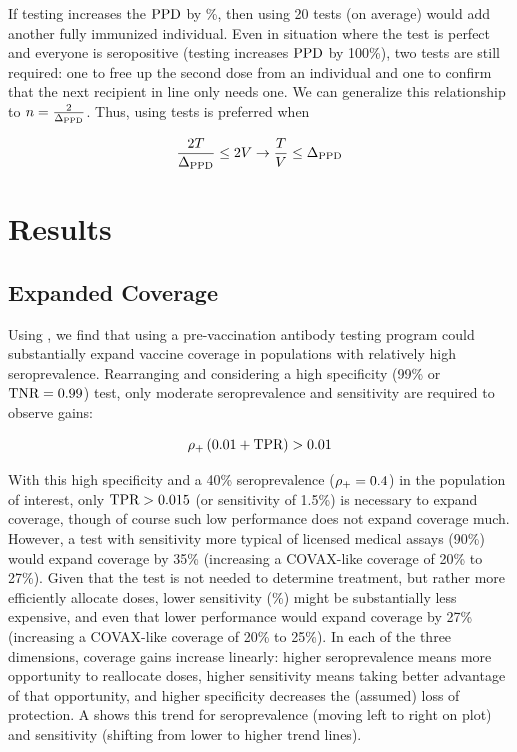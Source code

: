 \documentclass[10pt,a4paper,twocolumn]{article}
\begin{document}
If testing increases the $\textrm{PPD}$ by \%, then using 20 tests (on average) would add another fully immunized individual. Even in situation where the test is perfect and everyone is seropositive (\ie* testing increases $\textrm{PPD}$ by 100\%), two tests are still required: one to free up the second dose from an individual and one to confirm that the next recipient in line only needs one. We can generalize this relationship to $n = \frac{2}{\Delta_{\textrm{PPD}}}$. Thus, using tests is preferred when

\begin{equation}\label{costlim}
\frac{2T}{\Delta_{\textrm{PPD}}} \le 2V \rightarrow \frac{T}{V} \le \Delta_{\textrm{PPD}}
\end{equation}

\section*{Results}

\subsection*{Expanded Coverage}

Using , we find that using a pre-vaccination antibody testing program could substantially expand vaccine coverage in populations with relatively high seroprevalence. Rearranging  and considering a high specificity (99\% or $\textrm{TNR}=0.99$) test, only moderate seroprevalence and sensitivity are required to observe gains: 

\begin{equation}\label{egppd}
\rho_{{+}} \left(0.01 + \textrm{TPR}\right) > 0.01
\end{equation}

With this high specificity and a 40\% seroprevalence \mbox{($\rho_{{+}}=0.4$)} in the population of interest, only $\textrm{TPR} > 0.015$ (or sensitivity of 1.5\%) is necessary to expand coverage, though of course such low performance does not expand coverage much. However, a test with sensitivity more typical of licensed medical assays (90\%) would expand coverage by 35\% (\eg* increasing a COVAX-like coverage of 20\% to 27\%). Given that the test is not needed to determine treatment, but rather more efficiently allocate doses, lower sensitivity (\%) might be substantially less expensive, and even that lower performance would expand coverage by 27\% (\eg* increasing a COVAX-like coverage of 20\% to 25\%). In each of the three dimensions, coverage gains increase linearly: higher seroprevalence means more opportunity to reallocate doses, higher sensitivity means taking better advantage of that opportunity, and higher specificity decreases the (assumed) loss of protection. A shows this trend for seroprevalence (moving left to right on plot) and sensitivity (shifting from lower to higher trend lines).
\end{document}
